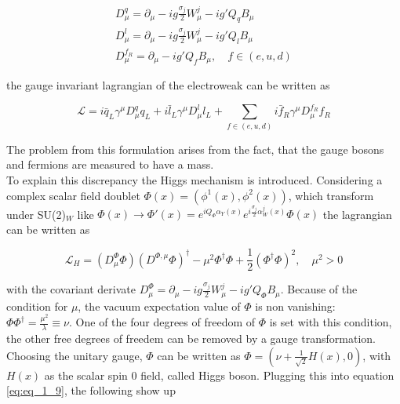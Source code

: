 \begin{equation}
	\label{eq:eq_1_7}
	\begin{split}
		D^{q}_{\mu} = \partial_{\mu}  - ig\frac{\sigma_{j}}{2}W^{j}_{\mu} - ig'Q_{q}B_{\mu} \\
		D^{l}_{\mu} = \partial_{\mu}  - ig\frac{\sigma_{j}}{2}W^{j}_{\mu} - ig'Q_{l}B_{\mu} \\
		D^{f_R}_{\mu} = \partial_{\mu}  - ig'Q_{f}B_{\mu}, \quad f \in (e, u, d)
	\end{split}
\end{equation}

the gauge invariant lagrangian of the electroweak can be written as 

\begin{equation}
	\label{eq:eq_1_8}
	\mathcal{L} = i\bar{q}_{L}\gamma^{\mu}D_{\mu}^{q}q_{L} + i\bar{l}_{L}\gamma^{\mu}D_{\mu}^{l}l_{L} + \sum_{f \in (e, u, d)} i\bar{f}_{R}\gamma^{\mu}D^{f_R}_{\mu}f_{R}
\end{equation}

The problem from this formulation arises from the fact, that the gauge bosons and fermions are measured to have a mass. \\

To explain this discrepancy the Higgs mechanism \cite{HIGGS} is introduced. Considering a complex scalar field doublet $\Phi(x) = (\phi^{1}(x), \phi^{2}(x))$, which transform under SU(2)$_{W}$ like $\Phi(x) \rightarrow \Phi'(x) = e^{iQ_{\Phi} \alpha_{Y}(x)} e^{i\frac{\sigma_{j}}{2}\alpha^{j}_{W}(x)}\Phi(x)$ the lagrangian can be written as

\begin{equation}
	\label{eq:eq_1_9}
	\mathcal{L}_{H} = (D^{\Phi}_{\mu}\Phi)(D^{\Phi, \mu}\Phi)^{\dagger} - \mu^2\Phi^{\dagger}\Phi + \frac{1}{2}(\Phi^{\dagger}\Phi)^2, \quad \mu^2 > 0
\end{equation}

with the covariant derivate $D^{\Phi}_{\mu} = \partial_{\mu}  - ig\frac{\sigma_{j}}{2}W^{j}_{\mu} - ig'Q_{\Phi}B_{\mu}$. Because of the condition for $\mu$, the vacuum expectation value of $\Phi$ is non vanishing: $\Phi\Phi^{\dagger} = \frac{\mu^2}{\lambda} \equiv \nu$. One of the four degrees of freedom of $\Phi$ is set with this condition, the other free degrees of freedem can be removed by a gauge transformation. Choosing the unitary gauge, $\Phi$ can be written as $\Phi = (\nu + \frac{1}{\sqrt{2}}H(x), 0)$, with $H(x)$ as the scalar spin 0 field, called Higgs boson. Plugging this into equation \ref{eq:eq_1_9}, the following show up


